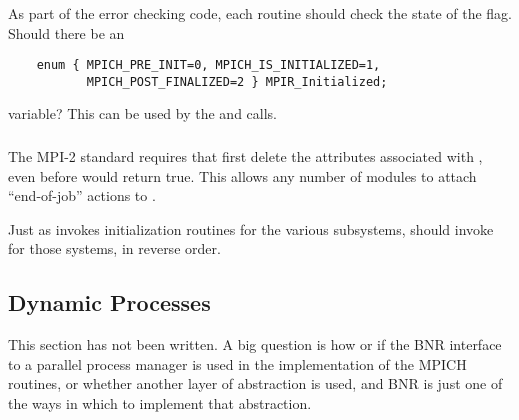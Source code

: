 \documentclass{article}
\begin{document}
\subsubsection{}
As part of the error checking code, each routine should check the
state of the  flag.  Should there be an 
\begin{verbatim}
    enum { MPICH_PRE_INIT=0, MPICH_IS_INITIALIZED=1,
           MPICH_POST_FINALIZED=2 } MPIR_Initialized;
\end{verbatim}
variable?  This can be used by the  and
calls.

\subsubsection{}
The MPI-2 standard requires that  first delete the
attributes associated with , even before
 would return true.  This allows any number of
modules to attach ``end-of-job'' actions to .

Just as  invokes initialization routines for
the various subsystems,  should invoke
 for those systems, in reverse order.

\subsection{Dynamic Processes}
\label{sec:spawn}

This section has not been written.  A big question is how or if the BNR
interface to a parallel process manager is used in the implementation
of the MPICH routines, or whether another layer of abstraction is
used, and BNR is just one of the ways in which to implement that abstraction.

\subsubsection{}

\subsubsection{}

\subsubsection{}
\end{document}
